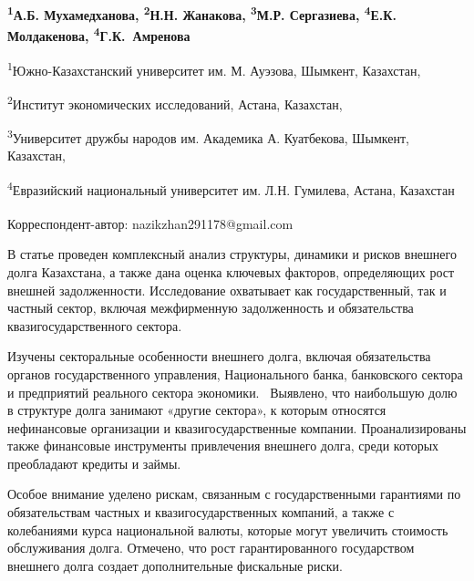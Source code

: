 
\begin{articleheader}

{\bfseries
\textsuperscript{1}А.Б. Мухамедханова,
\textsuperscript{2}Н.Н. Жанакова\textsuperscript{\envelope },
\textsuperscript{3}М.Р. Сергазиева,
\textsuperscript{4}Е.К. Молдакенова,
\textsuperscript{4}Г.К.~Амренова
}
\end{articleheader}

\begin{affiliation}
\textsuperscript{1}Южно-Казахстанский университет им. М. Ауэзова, Шымкент, Казахстан,

\textsuperscript{2}Институт экономических исследований, Астана, Казахстан,

\textsuperscript{3}Университет дружбы народов им. Академика А. Куатбекова, Шымкент, Казахстан,

\textsuperscript{4}Евразийский национальный университет им. Л.Н. Гумилева, Астана, Казахстан

\raggedright \textsuperscript{\envelope }Корреспондент-автор: nazikzhan291178@gmail.com
\end{affiliation}

В статье проведен комплексный анализ структуры, динамики и рисков
внешнего долга Казахстана, а также дана оценка ключевых факторов,
определяющих рост внешней задолженности. Исследование охватывает как
государственный, так и частный сектор, включая межфирменную
задолженность и обязательства квазигосударственного сектора.

Изучены секторальные особенности внешнего долга, включая обязательства
органов государственного управления, Национального банка, банковского
сектора и предприятий реального сектора экономики. ~Выявлено, что
наибольшую долю в структуре долга занимают «другие сектора», к которым
относятся нефинансовые организации и квазигосударственные компании.
Проанализированы также финансовые инструменты привлечения внешнего
долга, среди которых преобладают кредиты и займы.

Особое внимание уделено рискам, связанным с государственными гарантиями
по обязательствам частных и квазигосударственных компаний, а также с
колебаниями курса национальной валюты, которые могут увеличить стоимость
обслуживания долга. Отмечено, что рост гарантированного государством
внешнего долга создает дополнительные фискальные риски.

